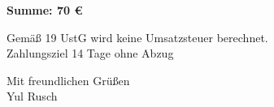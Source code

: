 \documentclass[12pt]{article}
\begin{document}
\vspace{2cm}

\begin{flushleft}

\textbf{Summe: \mbox{\hspace{12.7cm}} 70 €}

\vspace{0.2cm}

Gemäß 19 UstG wird keine Umsatzsteuer berechnet.\\
Zahlungsziel 14 Tage ohne Abzug\\

\vspace{0.5cm}

Mit freundlichen Grüßen\\
Yul Rusch

\end{flushleft}
\end{document}
